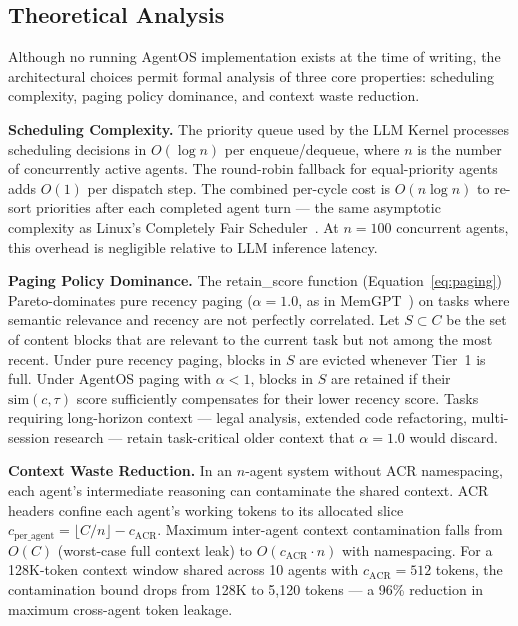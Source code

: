 \documentclass[journal]{IEEEtran}
\begin{document}
\subsection{Theoretical Analysis}

Although no running AgentOS implementation exists at the time of writing, the architectural choices permit formal analysis of three core properties: scheduling complexity, paging policy dominance, and context waste reduction.

\textbf{Scheduling Complexity.} The priority queue used by the LLM Kernel processes scheduling decisions in $O(\log n)$ per enqueue/dequeue, where $n$ is the number of concurrently active agents. The round-robin fallback for equal-priority agents adds $O(1)$ per dispatch step. The combined per-cycle cost is $O(n \log n)$ to re-sort priorities after each completed agent turn --- the same asymptotic complexity as Linux's Completely Fair Scheduler~\cite{liu2024agentbench}. At $n = 100$ concurrent agents, this overhead is negligible relative to LLM inference latency.

\textbf{Paging Policy Dominance.} The retain\_score function (Equation~\ref{eq:paging}) Pareto-dominates pure recency paging ($\alpha = 1.0$, as in MemGPT~\cite{packer2023memgpt}) on tasks where semantic relevance and recency are not perfectly correlated. Let $S \subset C$ be the set of content blocks that are relevant to the current task but not among the most recent. Under pure recency paging, blocks in $S$ are evicted whenever Tier~1 is full. Under AgentOS paging with $\alpha < 1$, blocks in $S$ are retained if their $\text{sim}(c, \tau)$ score sufficiently compensates for their lower recency score. Tasks requiring long-horizon context --- legal analysis, extended code refactoring, multi-session research --- retain task-critical older context that $\alpha = 1.0$ would discard.

\textbf{Context Waste Reduction.} In an $n$-agent system without ACR namespacing, each agent's intermediate reasoning can contaminate the shared context. ACR headers confine each agent's working tokens to its allocated slice $c_{\text{per\_agent}} = \lfloor C/n \rfloor - c_{\text{ACR}}$. Maximum inter-agent context contamination falls from $O(C)$ (worst-case full context leak) to $O(c_{\text{ACR}} \cdot n)$ with namespacing. For a 128K-token context window shared across 10 agents with $c_{\text{ACR}} = 512$ tokens, the contamination bound drops from 128K to 5,120 tokens --- a 96\% reduction in maximum cross-agent token leakage.
\end{document}
